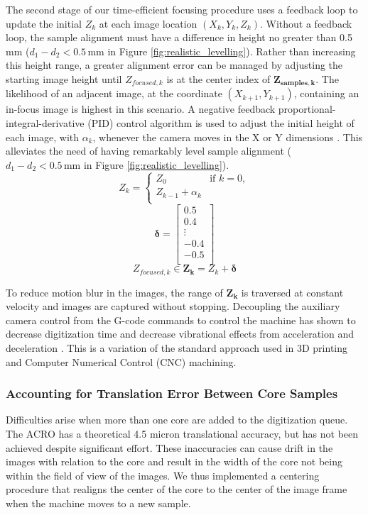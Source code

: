 \documentclass[a4paper,12pt]{article}
\begin{document}
The second stage of our time-efficient focusing procedure uses a feedback loop to update the initial $Z_k$ at each image location $(X_k, Y_k, Z_k)$. 
Without a feedback loop, the sample alignment must have a difference in height no greater than 0.5 mm ($d_1 - d_2 < 0.5\,\text{mm}$ in Figure \ref{fig:realistic_levelling}). 
Rather than increasing this height range, a greater alignment error can be managed by adjusting the starting image height until $Z_{focused,k}$ is at the center index of $\boldsymbol{Z_{samples,k}}$. 
The likelihood of an adjacent image, at the coordinate $(X_{k+1}, Y_{k+1})$, containing an in-focus image is highest in this scenario. 
A negative feedback  
proportional-integral-derivative (PID) control algorithm is used to adjust the initial height of each image, with $\alpha_k$, whenever the camera moves in the X or Y dimensions \citep{odwyer_summary_2000}. 
This alleviates the need of having remarkably level sample alignment ($d_1 - d_2 < 0.5\,\text{mm}$ in Figure \ref{fig:realistic_levelling}). 
\[
Z_k = \begin{cases}
  Z_0 & \text{if } k = 0,\\
  Z_{k-1} + \alpha_k \\
  \end{cases}
\]
\[\boldsymbol{\delta} = 
\begin{bmatrix}
  0.5 \\
  0.4 \\
  \vdots \\
  -0.4 \\
  -0.5 \\
  \end{bmatrix}\]
\[
Z_{focused,k} \in
\boldsymbol{Z_k} = 
Z_k + \boldsymbol{\delta}
\] 

To reduce motion blur in the images, the range of $\boldsymbol{Z_k}$ is traversed at constant velocity and images are captured without stopping. 
Decoupling the auxiliary camera control from the G-code commands to control the machine has shown to decrease digitization time and decrease vibrational effects from acceleration and deceleration \citep{propst_time_2025}.
This is a variation of the standard approach used in 3D printing and Computer Numerical Control (CNC) machining. 
  
\subsubsection{Accounting for Translation Error Between Core Samples}

Difficulties arise when more than one core are added to the digitization queue.
The ACRO has a theoretical 4.5 micron translational accuracy, but has not been achieved despite significant effort.
These inaccuracies can cause drift in the images with relation to the core and result in the width of the core not being within the field of view of the images.
We thus implemented a centering procedure that realigns the center of the core to the center of the image frame when the machine moves 
to a new sample. 
\end{document}

